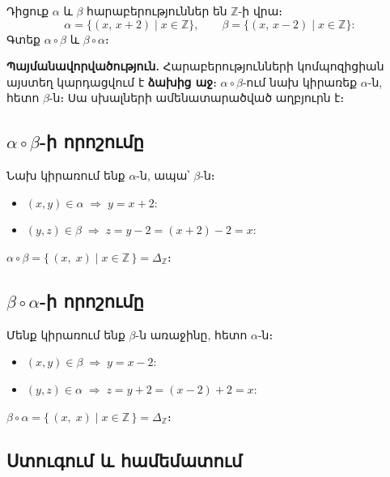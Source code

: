 \documentclass[12pt, a4paper]{article}
\newcommand{\Z}{\mathbb{Z}}
\begin{document}
\begin{problembox}
Դիցուք $\alpha$ և $\beta$ հարաբերություններ են $\Z$-ի վրա։
\[
  \alpha = \{(x,\, x+2) \mid x \in \Z\}, \qquad
  \beta  = \{(x,\, x-2) \mid x \in \Z\}:
\]
Գտեք $\alpha \circ \beta$ և $\beta \circ \alpha$։
\end{problembox}

\textbf{Պայմանավորվածություն.}\; Հարաբերությունների կոմպոզիցիան այստեղ կարդացվում է \textbf{ձախից աջ}։ $\alpha \circ \beta$-ում նախ կիրառեք $\alpha$-ն, հետո $\beta$-ն։ Սա սխալների ամենատարածված աղբյուրն է։

\medskip

\subsection*{$\alpha \circ \beta$-ի որոշումը}

Նախ կիրառում ենք $\alpha$-ն, ապա՝ $\beta$-ն։
\begin{itemize}[nosep]
  \item $(x, y) \in \alpha \;\Longrightarrow\; y = x + 2$:
  \item $(y, z) \in \beta  \;\Longrightarrow\; z = y - 2 = (x+2)-2 = x$:
\end{itemize}

\begin{answerbox}
$\alpha \circ \beta = \{\,(x,\; x) \mid x \in \Z\,\} = \Delta_{\Z}։$
\end{answerbox}

\subsection*{$\beta \circ \alpha$-ի որոշումը}

Մենք կիրառում ենք $\beta$-ն առաջինը, հետո $\alpha$-ն։
\begin{itemize}[nosep]
  \item $(x, y) \in \beta  \;\Longrightarrow\; y = x - 2$:
  \item $(y, z) \in \alpha \;\Longrightarrow\; z = y + 2 = (x-2)+2 = x$:
\end{itemize}

\begin{answerbox}
$\beta \circ \alpha = \{\,(x,\; x) \mid x \in \Z\,\} = \Delta_{\Z}։$
\end{answerbox}

\subsection*{Ստուգում և համեմատում}
\end{document}
